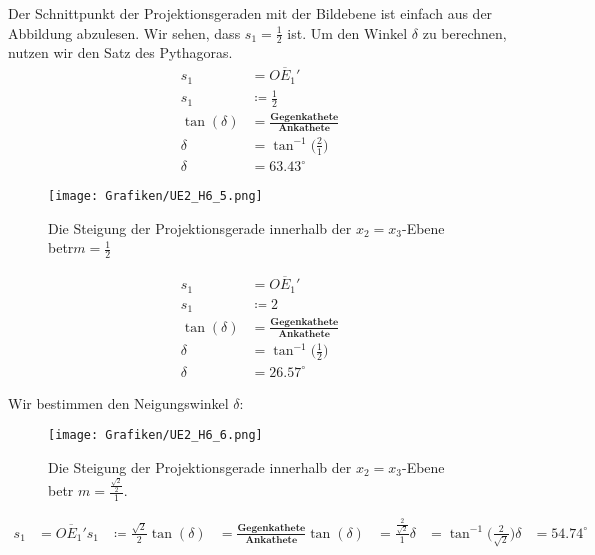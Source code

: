 \begin{Loesung}
\begin{Teilloesungen}
Der Schnittpunkt der Projektionsgeraden mit der Bildebene ist einfach aus der Abbildung abzulesen. Wir sehen, dass \ensuremath{s_1 = \frac{1}{2}} ist. Um den Winkel \ensuremath{\delta} zu berechnen, nutzen wir den Satz des Pythagoras.
\begin{align*}
s_1 &= \overline{OE_1'}\\
s_1 &\coloneqq \frac{1}{2}\\
\tan(\delta) &=\frac{\textbf{Gegenkathete}}{\textbf{Ankathete}}\\
\delta &= \tan^{-1}\Big(\frac{2}{1}\Big)\\
\delta &= 63.43^\circ
\end{align*}

\item \begin{figure}[H]
	\centering
	\texttt{[image: Grafiken/UE2\_H6\_5.png]}
	\caption{Die Steigung der Projektionsgerade innerhalb der \ensuremath{x_2 = x_3}-Ebene betr\agt \ensuremath{m = \frac{1}{2}}}
	\label{fig.H6_4}
\end{figure} 

\begin{align*}
s_1 &= \overline{OE_1'}\\
s_1 &\coloneqq 2\\
\tan(\delta) &=\frac{\textbf{Gegenkathete}}{\textbf{Ankathete}}\\
\delta &= \tan^{-1}\Big(\frac{1}{2}\Big)\\
\delta &= 26.57^\circ
\end{align*}

\item Wir bestimmen den Neigungswinkel $\delta$:
\begin{figure}[H]
	\centering
	\texttt{[image: Grafiken/UE2\_H6\_6.png]}
	\label{fig.H6_5}
	\caption{Die Steigung der Projektionsgerade innerhalb der \ensuremath{x_2 = x_3}-Ebene betr\agt 
	\ensuremath{m = \frac{\frac{\sqrt{2}}{2}}{1}}.}
\end{figure} 
\begin{align*}
s_1 &= \overline{OE_1'}
s_1 &\coloneqq \frac{\sqrt{2}}{2}
\tan(\delta) &= \frac{\textbf{Gegenkathete}}{\textbf{Ankathete}}
\tan(\delta) &= \frac{\frac{2}{\sqrt{2}}}{1}
\delta &= \tan^{-1}\Big(\frac{2}{\sqrt{2}}\Big)
\delta &= 54.74 ^\circ
\end{align*}
\end{Teilloesungen}
\end{Loesung}